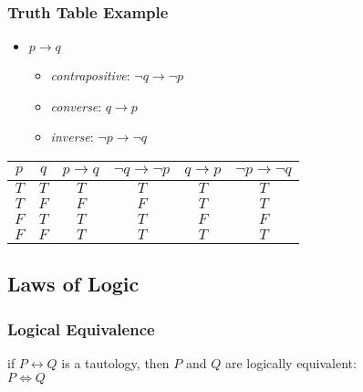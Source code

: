\documentclass[dvipsnames]{beamer}
\begin{document}
\begin{frame}
  \frametitle{Truth Table Example}

  \begin{itemize}
    \item $p \rightarrow q$
    \begin{itemize}
      \item \emph{contrapositive}: $\neg q \rightarrow \neg p$
      \item \emph{converse}: $q \rightarrow p$
      \item \emph{inverse}: $\neg p \rightarrow \neg q$
    \end{itemize}
  \end{itemize}

  \pause
  \begin{example}
    \begin{center}
      \begin{tabular}{|c|c||c||c||c||c|}\hline
        $p$ & $q$ & $p \rightarrow q$ & $\neg q \rightarrow \neg p$
            & $q \rightarrow p$ & $\neg p \rightarrow \neg q$\\\hline\hline
        $T$ & $T$ & $T$ & $T$ & $T$ & $T$\\\hline
        $T$ & $F$ & $F$ & $F$ & $T$ & $T$\\\hline
        $F$ & $T$ & $T$ & $T$ & $F$ & $F$\\\hline
        $F$ & $F$ & $T$ & $T$ & $T$ & $T$\\\hline
      \end{tabular}
    \end{center}
  \end{example}
\end{frame}

\subsection{Laws of Logic}

\begin{frame}
  \frametitle{Logical Equivalence}

  \begin{definition}
    if $P \leftrightarrow Q$ is a tautology, then $P$ and $Q$ are
    \alert{logically equivalent}:\\
    $P \Leftrightarrow Q$
  \end{definition}
\end{frame}
\end{document}
